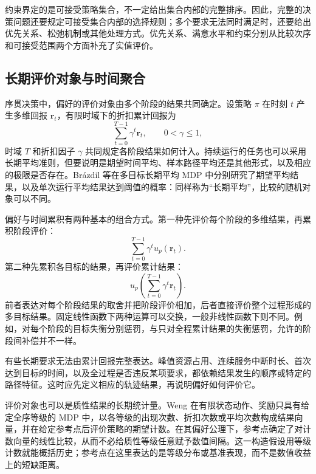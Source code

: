 约束界定的是可接受策略集合，不一定给出集合内部的完整排序。因此，完整的决策问题还要规定可接受集合内部的选择规则；多个要求无法同时满足时，还要给出优先关系、松弛机制或其他处理方式。优先关系、满意水平和约束分别从比较次序和可接受范围两个方面补充了实值评价。

\subsection{长期评价对象与时间聚合}\label{sec:criteria-time}

序贯决策中，偏好的评价对象由多个阶段的结果共同确定。设策略 \(\pi\) 在时刻 \(t\) 产生多维回报 \(\mathbf r_{t}\)，有限时域下的折扣累计回报为
\begin{equation}
\sum_{t = 0}^{T - 1}\gamma^{t}\mathbf r_{t},\quad\quad 0 < \gamma \leq 1,
\end{equation}
时域 \(T\) 和折扣因子 \(\gamma\) 共同规定各阶段结果如何计入\cite{roijers2013}。持续运行的任务也可以采用长期平均准则，但要说明是期望时间平均、样本路径平均还是其他形式，以及相应的极限是否存在。Brázdil 等在多目标长期平均 MDP 中分别研究了期望平均结果，以及单次运行平均结果达到阈值的概率\cite{brazdil2014}：同样称为“长期平均”，比较的随机对象可以不同。

偏好与时间累积有两种基本的组合方式。第一种先评价每个阶段的多维结果，再累积阶段评价：
\begin{equation}
\sum_{t = 0}^{T - 1}{\gamma^{t}u_{p}\left( \mathbf r_{t} \right)}.
\end{equation}
第二种先累积各目标的结果，再评价累计结果：
\begin{equation}
u_{p}\left( \sum_{t = 0}^{T - 1}{\gamma^{t}\mathbf r_{t}} \right).
\end{equation}
前者表达对每个阶段结果的取舍并把阶段评价相加，后者直接评价整个过程形成的多目标结果\cite{bauerle2014,hayes2023}。固定线性函数下两种运算可以交换，一般非线性函数下则不同。例如，对每个阶段的目标失衡分别惩罚，与只对全程累计结果的失衡惩罚，允许的阶段间补偿并不一样。

有些长期要求无法由累计回报完整表达。峰值资源占用、连续服务中断时长、首次达到目标的时间，以及全过程是否违反某项要求，都依赖结果发生的顺序或特定的路径特征。这时应先定义相应的轨迹结果，再说明偏好如何评价它。

评价对象也可以是质性结果的长期统计量。Weng 在有限状态动作、奖励只具有给定全序等级的 MDP 中，以各等级的出现次数、折扣次数或平均次数构成结果向量，并在给定参考点后评价策略的期望计数\cite{weng2011ordinal}。在其偏好公理下，参考点确定了对计数向量的线性比较，从而不必给质性等级任意赋予数值间隔。这一构造假设用等级计数就能概括历史；参考点在这里表达的是等级分布或基准表现，而不是数值收益上的短缺距离。

